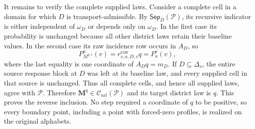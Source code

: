 It remains to verify the complete supplied laws. Consider a complete cell in a domain for which \(D\) is transport-admissible. By \(\mathsf{Sep}_D(\mathcal P)\), its recursive indicator is either independent of \(\omega_D\) or depends only on \(\omega_D\). In the first case its probability is unchanged because all other district laws retain their baseline values. In the second case its raw incidence row occurs in \(A_D\), so
\[
P_{M^{q,s}}^a(v)=r^{\mathrm{raw}}_{s,a,D,v}q=P_a^s(v),
\]
where the last equality is one coordinate of \(A_Dq=m_D\). If \(D\subseteq\Delta_s\), the entire source response block at \(D\) was left at its baseline law, and every supplied cell in that source is unchanged. Thus all complete cells, and hence all supplied laws, agree with \(\mathcal P\). Therefore \(\mathbf M^q\in\mathcal C_{\mathrm{sat}}(\mathcal P)\) and its target district law is \(q\). This proves the reverse inclusion. No step required a coordinate of \(q\) to be positive, so every boundary point, including a point with forced-zero profiles, is realized on the original alphabets.